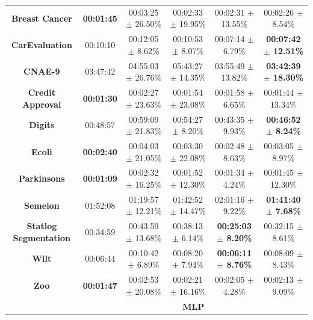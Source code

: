 \documentclass[preprint,12pt]{elsarticle}
\begin{document}
\begin{table}
{\begin{tabular}{cccccc}
\textbf{Breast Cancer}          & \textbf{00:01:45} & 00:03:25 $\pm$ 26.50\%          & 00:02:33 $\pm$ 19.95\%     & 00:02:31 $\pm$ 13.55\%         & 00:02:26 $\pm$ 8.54\%           \\
\textbf{CarEvaluation}          & 00:10:10          & 00:12:05 $\pm$ 8.62\%           & 00:10:53 $\pm$ 8.07\%      & 00:07:14 $\pm$ 6.79\%          & \textbf{00:07:42 $\pm$ 12.51\%} \\
\textbf{CNAE-9}                 & 03:47:42          & 04:55:03 $\pm$ 26.76\%          & 05:43:27 $\pm$ 14.35\%     & 03:55:49 $\pm$ 13.82\%         & \textbf{03:42:39 $\pm$ 18.30\%} \\
\textbf{Credit   Approval}      & \textbf{00:01:30} & 00:02:27 $\pm$ 23.63\%          & 00:01:54 $\pm$ 23.08\%     & 00:01:58 $\pm$ 6.65\%          & 00:01:44 $\pm$ 13.34\%          \\
\textbf{Digits}                 & 00:48:57          & 00:59:09 $\pm$ 21.83\%          & 00:54:27 $\pm$ 8.20\%      & 00:43:35 $\pm$ 9.93\%          & \textbf{00:46:52 $\pm$ 8.24\%}  \\
\textbf{Ecoli}                  & \textbf{00:02:40} & 00:04:03 $\pm$ 21.05\%          & 00:03:30 $\pm$ 22.08\%     & 00:02:48 $\pm$ 8.63\%          & 00:03:05 $\pm$ 8.97\%           \\
\textbf{Parkinsons}             & \textbf{00:01:09} & 00:02:32 $\pm$ 16.25\%          & 00:01:52 $\pm$ 12.30\%     & 00:01:34 $\pm$ 4.24\%          & 00:01:45 $\pm$ 12.30\%          \\
\textbf{Semeion}                & 01:52:08          & 01:19:57 $\pm$ 12.21\%          & 01:42:52 $\pm$ 14.47\%     & 02:01:16 $\pm$ 9.22\%          & \textbf{01:41:40 $\pm$ 7.68\%}  \\
\textbf{Statlog   Segmentation} & 00:34:59          & 00:43:59 $\pm$ 13.68\%          & 00:38:13 $\pm$ 6.14\%      & \textbf{00:25:03 $\pm$ 8.20\%} & 00:32:15 $\pm$ 8.61\%           \\
\textbf{Wilt}                   & 00:06:44          & 00:10:42 $\pm$ 6.89\%           & 00:08:20 $\pm$ 7.94\%      & \textbf{00:06:11 $\pm$ 8.76\%} & 00:08:09 $\pm$ 8.43\%           \\
\textbf{Zoo}                    & \textbf{00:01:47} & 00:02:53 $\pm$ 20.08\%          & 00:02:21 $\pm$ 16.16\%     & 00:02:05 $\pm$ 4.28\%          & 00:02:13 $\pm$ 9.09\%           \\ \hline
                                & \multicolumn{5}{c}{\textbf{MLP}}                                                                                                    \\ \hline

\end{tabular}}
\end{table}
\end{document}
